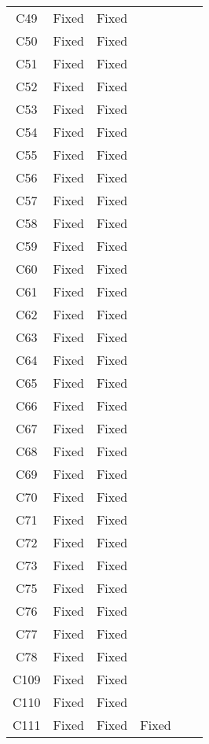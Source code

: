 \begin{table}[!t]
{\begin{tabular}{|c|c|c|c|c|c|}
C49               & Fixed     &Fixed   \\
C50               & Fixed     &Fixed   \\
C51               & Fixed     &Fixed   \\
C52               & Fixed     &Fixed   \\
C53               & Fixed     &Fixed   \\
C54               & Fixed     &Fixed   \\
C55               & Fixed     &Fixed   \\
C56               & Fixed     &Fixed   \\
C57               & Fixed     &Fixed   \\
C58               & Fixed     &Fixed   \\
C59               & Fixed     &Fixed   \\
C60               & Fixed     &Fixed   \\
C61               & Fixed     &Fixed   \\
C62               & Fixed     &Fixed   \\
C63               & Fixed     &Fixed   \\
C64               & Fixed     &Fixed   \\
C65               & Fixed     &Fixed   \\
C66               & Fixed     &Fixed   \\
C67               & Fixed     &Fixed   \\
C68               & Fixed     &Fixed   \\
C69               & Fixed     &Fixed   \\
C70               & Fixed     &Fixed   \\
C71               & Fixed     &Fixed   \\
C72               & Fixed     &Fixed   \\
C73               & Fixed     &Fixed   \\
C75               & Fixed     &Fixed   \\
C76               & Fixed     &Fixed   \\
C77               & Fixed     &Fixed   \\
C78               & Fixed     &Fixed   \\
C109              & Fixed     &Fixed   \\
C110              & Fixed     &Fixed   \\
C111              & Fixed     & Fixed     &Fixed   \\

\end{tabular}}
\end{table}
